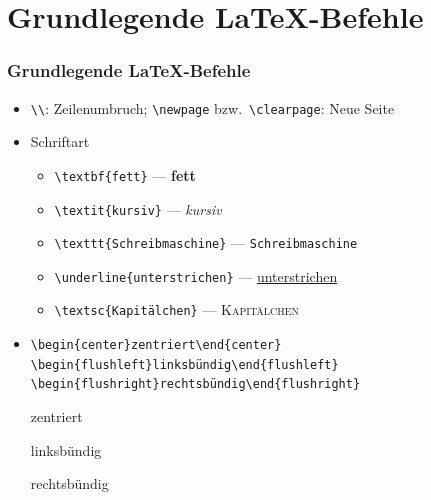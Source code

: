 \section{Grundlegende \LaTeX-Befehle}

\begin{frame}[<+->][fragile]
	\frametitle{Grundlegende \LaTeX-Befehle}
	
	\begin{itemize}
		\item \lstinline!\\!: Zeilenumbruch; \lstinline!\newpage! bzw.\ \lstinline!\clearpage!: Neue Seite
		\item Schriftart
		\begin{itemize}
			\item \lstinline!\textbf{fett}! — {\rmfamily\textbf{fett}}
			\item \lstinline!\textit{kursiv}! — {\rmfamily\textit{kursiv}}
			\item \lstinline!\texttt{Schreibmaschine}! — {\rmfamily\texttt{Schreibmaschine}}
			\item \lstinline!\underline{unterstrichen}! — {\rmfamily\underline{unterstrichen}}
			\item \lstinline!\textsc{Kapitälchen}! — {\rmfamily\textsc{Kapitälchen}}
		\end{itemize}
		\item \lstinline!\begin{center}zentriert\end{center} \begin{flushleft}linksbündig\end{flushleft} \begin{flushright}rechtsbündig\end{flushright}!
		
		{\justifying\rmfamily
		\begin{center}zentriert\end{center}
		\begin{flushleft}linksbündig\end{flushleft}
		\begin{flushright}rechtsbündig\end{flushright}}
	\end{itemize}
\end{frame}

